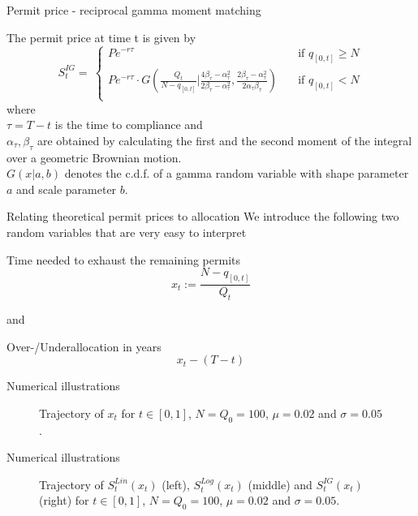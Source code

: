 {Permit price - reciprocal gamma moment matching}
    \begin{block}{}
    The permit price at time t is given by
$$
S_t^{IG}  = \ \left\{
         \begin{array}{ll}
            P e^{-r\tau}
            & \quad \mbox{if $q_{[0,t]} \ge N$} \\
            P e^{-r\tau} \cdot G \left(\frac{Q_t}{N - q_{[0,t]}} | \frac{4\beta_{\tau} - \alpha^2_{\tau}}{2\beta_{\tau} - \alpha^2_{\tau}} , \frac{2\beta_{\tau} - \alpha^2_{\tau}}{2 \alpha_{\tau} \beta_{\tau}}  \right)
            & \quad \mbox{if $q_{[0,t]} < N$} \\
         \end{array} \right.
$$
where \\
$\tau = T - t$ is the time to compliance and \\
$\alpha_{\tau}, \beta_{\tau}$ are obtained by calculating the first and the second moment of the integral over a geometric Brownian motion. \\
$G(x|a,b)$ denotes the c.d.f. of a gamma random variable with shape parameter $a$ and scale parameter $b$.
    \end{block}


{Relating theoretical permit prices to allocation}
    We introduce the following two random variables that are very easy to interpret
    \begin{block}{Time needed to exhaust the remaining permits}
$$
x_t := \frac{N - q_{[0,t]}}{Q_t}
$$
    \end{block}
and
\begin{block}{Over-/Underallocation in years}
$$
x_t - (T-t)
$$
    \end{block}


{Numerical illustrations }
\begin{center}
\begin{figure}[h!]
\centering
{}
\caption{Trajectory of $x_t$ for $t \in [0,1]$,  $N = Q_0 = 100$, $\mu = 0.02$ and $\sigma = 0.05$.}
\label{fig:plot4}
\end{figure}
\end{center}

{Numerical illustrations}
\begin{center}
\begin{figure}[h!]
\centering
{}
\caption{Trajectory of $S_t^{Lin}(x_t)$ (left), $S_t^{Log}(x_t)$ (middle) and $S_t^{IG}(x_t)$ (right) for $t \in [0,1]$,  $N = Q_0 = 100$, $\mu = 0.02$ and $\sigma = 0.05$.}
\label{fig:plot8}
\end{figure}
\end{center}

